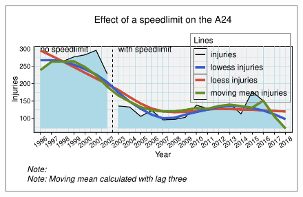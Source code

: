 \documentclass[
  letterpaper,
  DIV=11,
  numbers=noendperiod]{scrreprt}
\begin{document}
\begin{figure}[H]

{\centering \includegraphics{./ch_scplot_files/figure-pdf/complex1-1.pdf}

}

\end{figure}
\end{document}

